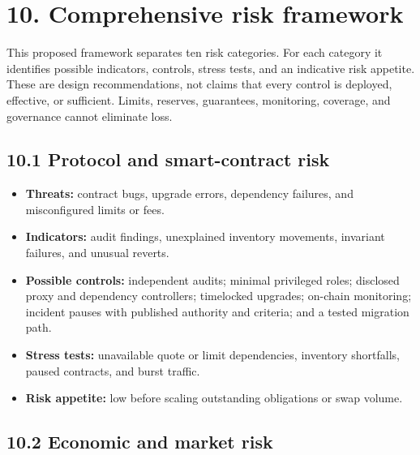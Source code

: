 \documentclass[11pt]{article}
\begin{document}
\section*{10. Comprehensive risk framework}

This proposed framework separates ten risk categories. For each category it identifies possible indicators, controls, stress tests, and an indicative risk appetite. These are design recommendations, not claims that every control is deployed, effective, or sufficient. Limits, reserves, guarantees, monitoring, coverage, and governance cannot eliminate loss.

\subsection*{10.1 Protocol and smart-contract risk}

\begin{itemize}[leftmargin=*]
\item \textbf{Threats:} contract bugs, upgrade errors, dependency failures, and misconfigured limits or fees.
\item \textbf{Indicators:} audit findings, unexplained inventory movements, invariant failures, and unusual reverts.
\item \textbf{Possible controls:} independent audits; minimal privileged roles; disclosed proxy and dependency controllers; timelocked upgrades; on-chain monitoring; incident pauses with published authority and criteria; and a tested migration path.
\item \textbf{Stress tests:} unavailable quote or limit dependencies, inventory shortfalls, paused contracts, and burst traffic.
\item \textbf{Risk appetite:} low before scaling outstanding obligations or swap volume.
\end{itemize}
\subsection*{10.2 Economic and market risk}
\end{document}
